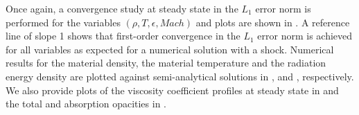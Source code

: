 \documentclass[times,doublespace]{fldauth}%
\begin{document}
Once again, a convergence study at steady state in the $L_1$ error norm is performed for the variables $(\rho, T, \epsilon, Mach)$ and plots are shown in  . A reference line of slope 1 shows that first-order convergence in the $L_1$ error norm is achieved for all variables as expected for a numerical solution with a shock.
Numerical results for the material density, the material temperature and the radiation energy density are plotted against semi-analytical solutions in ,  and , respectively. We also provide plots of the viscosity coefficient profiles at steady state in  and the total and absorption opacities in .
%
\end{document}
